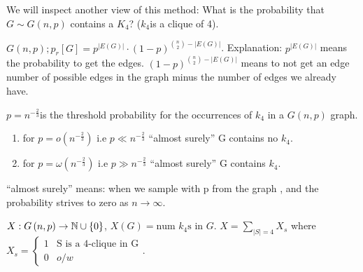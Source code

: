 \begin{example}
We will inspect another view of this method: What is the probability
that $G\sim G\left(n,p\right)$ contains a $K_{4}$? ($k_{4}$is a
clique of 4).
\begin{remark}
$G\left(n,p\right);p_{r}\left[G\right]=p^{\left|E\left(G\right)\right|}\cdot\left(1-p\right)^{\binom{n}{2}-\left|E\left(G\right)\right|}$.
Explanation: $p^{\left|E\left(G\right)\right|}$ means the probability
to get the edges. $\left(1-p\right)^{\binom{n}{2}-\left|E\left(G\right)\right|}$
means to not get an edge number of possible edges in the graph minus
the number of edges we already have.
\end{remark}

\begin{thm}
$p=n^{-\frac{2}{3}}$is the threshold probability for the occurrences
of $k_{4}$ in a $G\left(n,p\right)$ graph.
\begin{enumerate}
\item for $p=o\left(n^{-\frac{2}{3}}\right)$ i.e $p\ll n^{-\frac{2}{3}}$
``almost surely'' G contains no $k_{4}$.
\item for $p=\omega\left(n^{-\frac{2}{3}}\right)$ i.e $p\gg n^{-\frac{2}{3}}$
``almost surely'' G contains $k_{4}$.
\end{enumerate}
\begin{remark}
``almost surely'' means: when we sample with p from the graph ,
and the probability strives to zero as $n\to\infty$.
\end{remark}

\end{thm}

$X:G\left(n,p\right)\to\mathbb{N}\cup\left\{ 0\right\} $, $X\left(G\right)=\text{num }k_{4}\text{s in }G$.
$X=\sum\limits _{\left|S\right|=4}X_{s}$ where $X_{s}=\begin{cases}
1 & \text{S is a 4-clique in G}\\
0 & o/w
\end{cases}$. 
\end{example}

